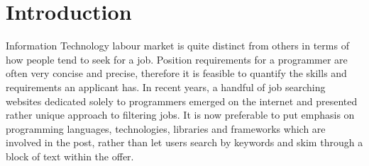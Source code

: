 \chapter{Introduction}
\ifpdf
    \graphicspath{{Introduction/IntroductionFigs/PNG/}{Introduction/IntroductionFigs/PDF/}{Introduction/IntroductionFigs/}}
\else
    \graphicspath{{Introduction/IntroductionFigs/EPS/}{Introduction/IntroductionFigs/}}
\fi

Information Technology labour market is quite distinct from others in terms of how people tend to seek for a job. Position requirements for a programmer are often very concise and precise, therefore it is feasible to quantify the skills and requirements an applicant has.
In recent years, a handful of job searching websites dedicated solely to programmers emerged on the internet and presented rather unique approach to filtering jobs. It is now preferable to put emphasis on programming languages, technologies, libraries and frameworks which are involved in the post, rather than let users search by keywords and skim through a block of text within the offer.




